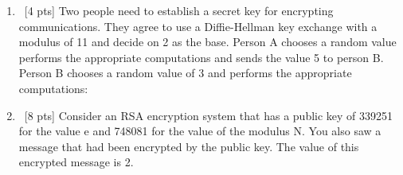 \documentclass[12pt]{article}
\newenvironment{sol}[1][Solution]{\begin{trivlist}\item[\hskip\labelsep {\bfseries #1:}]}{\end{trivlist}}
\begin{document}
\begin{enumerate}
\begin{enumerate}
    \end{enumerate}

    \item \ [4 pts] Two people need to establish a secret key for encrypting communications. They agree to use a Diffie-Hellman key exchange with a modulus of 11 and decide on 2 as the base. Person A chooses a random value performs the appropriate computations and sends the value 5 to person B. Person B chooses a random value of 3 and performs the appropriate computations:

    \item \ [8 pts] Consider an RSA encryption system that has a public key of 339251 for the value e and 748081 for the value of the modulus N. You also saw a message that had been encrypted by the public key. The value of this encrypted message is 2.


\end{enumerate}
\end{document}
